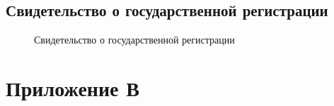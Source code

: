 \newpage

\subsection*{Свидетельство о государственной регистрации}

\begin{figure}[!h]
\caption{Свидетельство о государственной регистрации}
\label{ris:expi_reg}
\end{figure}

\newpage

\section*{Приложение В}\label{sec:applic_c}
\begin{figure}[!h]
\label{ris:education_act}
\end{figure}

\newpage

\begin{figure}
\label{ris:industry_act}
\end{figure} 